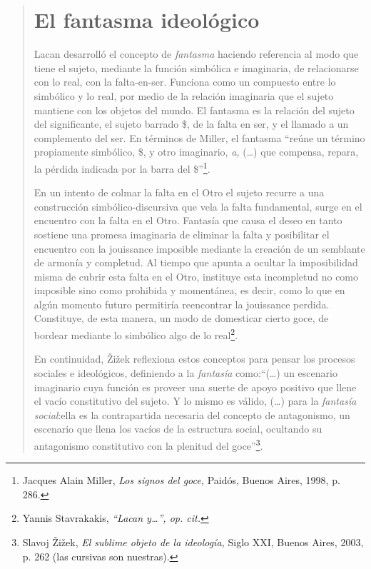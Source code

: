 \begin{quote}
\section{El fantasma ideológico}

Lacan desarrolló el concepto de \emph{fantasma} haciendo referencia al modo que tiene el sujeto, mediante la función simbólica e imaginaria, de relacionarse con lo real, con la falta-en-ser. Funciona como un compuesto entre lo simbólico y lo real, por medio de la relación imaginaria que el sujeto mantiene con los objetos del mundo. El fantasma es la relación del sujeto del significante, el sujeto barrado \$, de la falta en ser, y el llamado a un complemento del ser. En términos de Miller, el fantasma \enquote{reúne un término propiamente simbólico, \$, y otro imaginario, \emph{a,} (\dots) que compensa, repara, la pérdida indicada por la barra del \$}\footnote{Jacques Alain Miller, \emph{Los signos del goce,} Paidós, Buenos Aires, 1998, p. 286.}.

En un intento de colmar la falta en el Otro el sujeto recurre a una construcción simbólico-discursiva que vela la falta fundamental, surge en el encuentro con la falta en el Otro. Fantasía que causa el deseo en tanto sostiene una promesa imaginaria de eliminar la falta y posibilitar el encuentro con la jouissance imposible mediante la creación de un semblante de armonía y completud. Al tiempo que apunta a ocultar la imposibilidad misma de cubrir esta falta en el Otro, instituye esta incompletud no como imposible sino como prohibida y momentánea, es decir, como lo que en algún momento futuro permitiría reencontrar la jouissance perdida. Constituye, de esta manera, un modo de domesticar cierto goce, de bordear mediante lo simbólico algo de lo real\footnote{Yannis Stavrakakis, \emph{\enquote{Lacan y\ldots}, op. cit.}}.

En continuidad, Žižek reflexiona estos conceptos para pensar los procesos sociales e ideológicos, definiendo a la \emph{fantasía} como:\enquote{(\dots) un escenario imaginario cuya función es proveer una suerte de apoyo positivo que llene el vacío constitutivo del sujeto. Y lo mismo es válido, (\dots) para la \emph{fantasía social}:ella es la contrapartida necesaria del concepto de antagonismo, un escenario que llena los vacíos de la estructura social, ocultando su antagonismo constitutivo con la plenitud del goce}\footnote{Slavoj Žižek, \emph{El sublime objeto de la ideología,} Siglo XXI, Buenos Aires, 2003, p. 262 (las cursivas son nuestras).}.


\end{quote}
